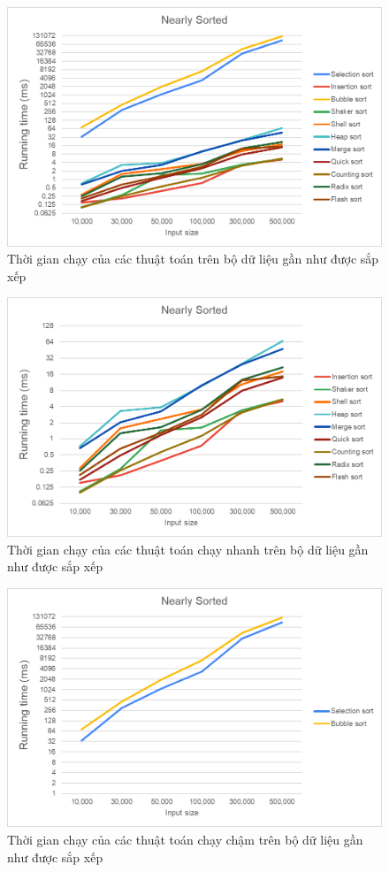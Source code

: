 \begin{figure}[H]
    \centering
    \includegraphics[width = 0.9\linewidth]{img/experiment/running time/nearly sorted/1.png}
    \caption{Thời gian chạy của các thuật toán trên bộ dữ liệu gần như được sắp xếp}
\end{figure}

\begin{figure}[H]
    \centering
    \includegraphics[width = 0.9\linewidth]{img/experiment/running time/nearly sorted/2.png}
    \caption{Thời gian chạy của các thuật toán chạy nhanh trên bộ dữ liệu gần như được sắp xếp}
\end{figure}

\begin{figure}[H]
    \centering
    \includegraphics[width = 0.9\linewidth]{img/experiment/running time/nearly sorted/3.png}
    \caption{Thời gian chạy của các thuật toán chạy chậm trên bộ dữ liệu gần như được sắp xếp}
\end{figure}

